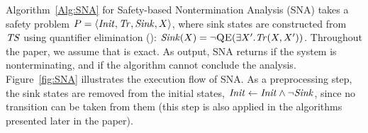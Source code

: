 Algorithm~\ref{Alg:SNA} for Safety-based Nontermination Analysis (SNA) takes a
safety problem $P = \langle \mathit{Init}, \mathit{Tr}, \mathit{Sink}, X \rangle$, where sink states are constructed from $\mathit{TS}$ using
quantifier elimination (\QE): $\mathit{Sink}(X) = \lnot \textsc{QE}(\exists X'. \mathit{Tr}(X,X'))$.
Throughout the paper, we assume that \QE{} is exact.
As output, SNA returns \NONTERM{} if the system is nonterminating, and \UNKNOWN{} if the algorithm cannot conclude the analysis.
Figure~\ref{fig:SNA} illustrates the execution flow of SNA.
As a preprocessing step, the sink states are removed from the initial states, $\mathit{Init} \gets \mathit{Init} \land \lnot \mathit{Sink}$,
since no transition can be taken from them (this step is also applied in the algorithms presented later in the paper).

\begin{algorithm}[t!]
	\SetInd{0.5em}{0.5em}
    \DontPrintSemicolon
    \small
    \newcommand{\Continue}{\textbf{continue}}
    \caption{Safety-based Nontermination Analysis (SNA), cf.~\cite{DBLP:conf/tacas/ChenCFNO14}}
    \label{Alg:SNA}
    \Output{\NONTERM $\mid$ \UNKNOWN}
    
\end{algorithm}

